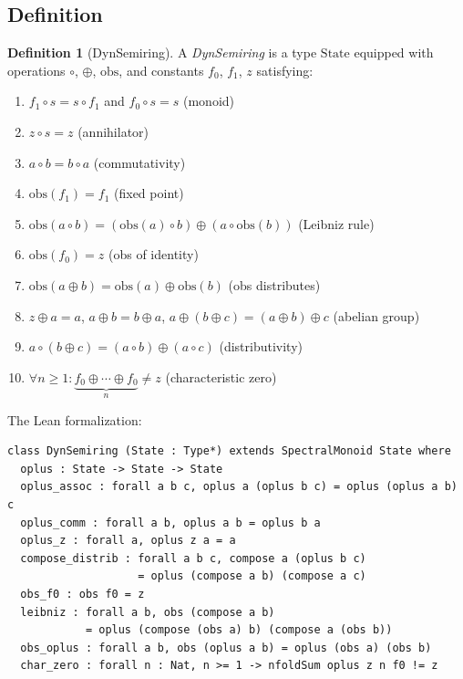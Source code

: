 \documentclass[11pt,a4paper]{article}
\theoremstyle{definition}
\newtheorem{definition}[theorem]{Definition}
\theoremstyle{remark}
\newcommand{\compose}{\mathbin{\circ}}
\newcommand{\opl}{\oplus}
\newcommand{\obs}{\mathrm{obs}}
\newcommand{\fzero}{f_0}
\newcommand{\fone}{f_1}
\begin{document}
\subsection{Definition}

\begin{definition}[DynSemiring]
\label{def:dynsemiring}
A \emph{DynSemiring} is a type $\mathrm{State}$ equipped with operations
$\compose$, $\opl$, $\obs$, and constants $\fzero$, $\fone$, $z$
satisfying:
\begin{enumerate}[label=(DS\arabic*)]
  \item $\fone \compose s = s \compose \fone$ and $\fzero \compose s = s$
    \hfill (monoid)
  \item $z \compose s = z$ \hfill (annihilator)
  \item $a \compose b = b \compose a$ \hfill (commutativity)
  \item $\obs(\fone) = \fone$ \hfill (fixed point)
  \item $\obs(a \compose b) = (\obs(a) \compose b) \opl (a \compose \obs(b))$
    \hfill (Leibniz rule)
  \item $\obs(\fzero) = z$ \hfill (obs of identity)
  \item $\obs(a \opl b) = \obs(a) \opl \obs(b)$ \hfill (obs distributes)
  \item $z \opl a = a$, $a \opl b = b \opl a$,
    $a \opl (b \opl c) = (a \opl b) \opl c$ \hfill (abelian group)
  \item $a \compose (b \opl c) = (a \compose b) \opl (a \compose c)$
    \hfill (distributivity)
  \item $\forall n \geq 1: \underbrace{\fzero \opl \cdots \opl \fzero}_{n} \neq z$
    \hfill (characteristic zero)
\end{enumerate}
\end{definition}

The Lean formalization:

\begin{lstlisting}[caption={DynSemiring definition (Core/Semiring.lean)}]
class DynSemiring (State : Type*) extends SpectralMonoid State where
  oplus : State -> State -> State
  oplus_assoc : forall a b c, oplus a (oplus b c) = oplus (oplus a b) c
  oplus_comm : forall a b, oplus a b = oplus b a
  oplus_z : forall a, oplus z a = a
  compose_distrib : forall a b c, compose a (oplus b c)
                    = oplus (compose a b) (compose a c)
  obs_f0 : obs f0 = z
  leibniz : forall a b, obs (compose a b)
            = oplus (compose (obs a) b) (compose a (obs b))
  obs_oplus : forall a b, obs (oplus a b) = oplus (obs a) (obs b)
  char_zero : forall n : Nat, n >= 1 -> nfoldSum oplus z n f0 != z
\end{lstlisting}
\end{document}
